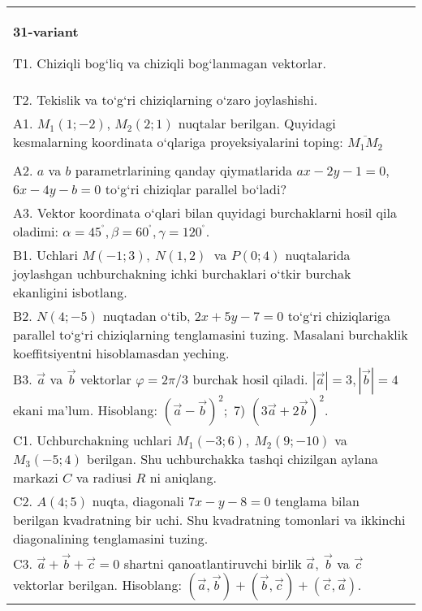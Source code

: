 \documentclass{article}
\begin{document}
\begin{tabular}{m{17cm}}
\textbf{31-variant}
\newline

T1. 
Chiziqli bog‘liq va chiziqli bog‘lanmagan vektorlar.
 \\
T2. 
Tekislik va to‘g‘ri chiziqlarning o‘zaro joylashishi.
 \\
A1. $M_1 (1; -2) $, $M_2 (2; 1) $ nuqtalar berilgan.
Quyidagi kesmalarning koordinata o‘qlariga proyeksiyalarini toping: $\overline{M_1M_2}$ \\
 \\
A2. 
$a$ va $b$ parametrlarining qanday qiymatlarida
$ax-2y-1=0$, $6x-4y-b=0$ to‘g‘ri chiziqlar parallel bo‘ladi?
 \\
A3. Vektor koordinata o‘qlari bilan quyidagi burchaklarni hosil qila oladimi:
$\alpha = 45^{{^\circ}},\beta = 60^{{^\circ}},\gamma = 120^{{^\circ}}$.
 \\
B1. 
Uchlari \(M (-1;3),\ N (1,2) \ \) va \(P (0;4) \)
nuqtalarida joylashgan uchburchakning ichki burchaklari o‘tkir burchak
ekanligini isbotlang.
 \\
B2. 
\(N (4;-5) \) nuqtadan o‘tib, $2x+5y-7=0$
to‘g‘ri chiziqlariga parallel to‘g‘ri chiziqlarning tenglamasini tuzing. Masalani burchaklik
koeffitsiyentni hisoblamasdan yeching.
 \\
B3. 
$\vec{a}$ va $\vec{b}$ vektorlar $\varphi = 2\pi/3$ burchak hosil qiladi. $|\vec{a}| = 3,|\vec{b}| = 4$ ekani ma’lum. Hisoblang:
$ (\vec{a} - \vec{b}) ^{2};$ 7) $ (3\vec{a} + 2\vec{b}) ^{2}$.
 \\
C1. 
Uchburchakning uchlari \(M_{1} (- 3;6),\ M_{2} (9; - 10) \)
va \(M_{3} (-5;4) \) berilgan. Shu uchburchakka tashqi chizilgan
aylana markazi $C$ va radiusi $R$ ni aniqlang.
 \\
C2. 
\(A (4;5) \) nuqta, diagonali \(7x - y - 8 = 0\) tenglama
bilan berilgan kvadratning bir uchi. Shu kvadratning tomonlari va
ikkinchi diagonalining tenglamasini tuzing.
 \\
C3. \(\vec{a} + \vec{b} + \vec{c} = 0\) shartni qanoatlantiruvchi birlik \(\vec{a},\ \vec{b}\) va \(\vec{c}\) vektorlar berilgan. Hisoblang: \(\left(\vec{a},\vec{b} \right) + \left(\vec{b},\vec{c} \right) + \left(\vec{c},\vec{a} \right) \).
 \\

\end{tabular}
\vspace{1cm}
\end{document}
